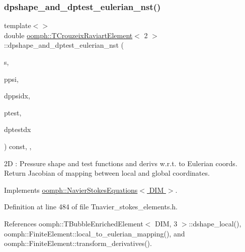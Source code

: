 \subsubsection{\texorpdfstring{dpshape\+\_\+and\+\_\+dptest\+\_\+eulerian\+\_\+nst()}{dpshape\_and\_dptest\_eulerian\_nst()}\hspace{0.1cm}{\footnotesize\ttfamily [2/3]}}
{\footnotesize\ttfamily template$<$$>$ \\
double \hyperlink{classoomph_1_1TCrouzeixRaviartElement}{oomph\+::\+T\+Crouzeix\+Raviart\+Element}$<$ 2 $>$\+::dpshape\+\_\+and\+\_\+dptest\+\_\+eulerian\+\_\+nst (\begin{DoxyParamCaption}\item[{const \hyperlink{classoomph_1_1Vector}{Vector}$<$ double $>$ \&}]{s,  }\item[{\hyperlink{classoomph_1_1Shape}{Shape} \&}]{ppsi,  }\item[{\hyperlink{classoomph_1_1DShape}{D\+Shape} \&}]{dppsidx,  }\item[{\hyperlink{classoomph_1_1Shape}{Shape} \&}]{ptest,  }\item[{\hyperlink{classoomph_1_1DShape}{D\+Shape} \&}]{dptestdx }\end{DoxyParamCaption}) const\hspace{0.3cm}{\ttfamily [inline]}, {\ttfamily [protected]}, {\ttfamily [virtual]}}

2D \+: Pressure shape and test functions and derivs w.\+r.\+t. to Eulerian coords. Return Jacobian of mapping between local and global coordinates. 

Implements \hyperlink{classoomph_1_1NavierStokesEquations_a2f3024a4d370ec45ddffacb236bc2bb2}{oomph\+::\+Navier\+Stokes\+Equations$<$ D\+I\+M $>$}.



Definition at line 484 of file Tnavier\+\_\+stokes\+\_\+elements.\+h.



References oomph\+::\+T\+Bubble\+Enriched\+Element$<$ D\+I\+M, 3 $>$\+::dshape\+\_\+local(), oomph\+::\+Finite\+Element\+::local\+\_\+to\+\_\+eulerian\+\_\+mapping(), and oomph\+::\+Finite\+Element\+::transform\+\_\+derivatives().

\mbox{\label{classoomph_1_1TCrouzeixRaviartElement_a2fc4b14aa6bc8c93f2df151c42f2beef}} 
